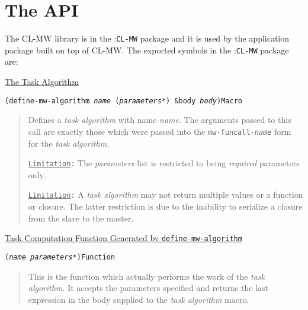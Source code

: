 \documentclass[titlepage,12pt]{book}
\newcommand{\xsmall}{\latexhtml{\small}{}}
\newcommand{\xnormalsize}{\latexhtml{\normalsize}{}}
\newcommand{\clmw}{\xsmall\textsc{CL-MW}\xnormalsize\xspace}
\newcommand{\package}[1]{\mbox{:\uppercase{\xsmall\texttt{#1}\xnormalsize}} package\xspace}
\newcommand{\mwpackage}{\package{CL-MW}}
\newcommand{\ta}{\textit{task algorithm}\xspace}
\newcommand{\macro}[1]{\mbox{\texttt{#1}}\xspace}
\newcommand{\genmacroname}[1]{\mbox{\texttt{#1\textit{name}}}\xspace}
\newcommand{\Limitation}{\texttt{\underline{Limitation}:}\xspace}
\newcommand{\apiheader}[1]{\begin{center}\underline{#1}\end{center}}
\newcommand{\apifunc}[2]{\noindent\xsmall\texttt{(#1)}\hspace*{\fill}\xnormalsize\texttt{#2}}
\newenvironment{apientry}[2]
	{\apifunc{#1}{#2}\begin{quotation}}
	{\end{quotation}}
\begin{document}
\section{The API}

The \clmw library is in the \mwpackage and it is used by the application
package built on top of \clmw. The exported symbols in the \mwpackage are:

\apiheader{The Task Algorithm}

\begin{apientry}
{define-mw-algorithm \emph{name} (\emph{parameters*}) \&body \emph{body}}
{Macro}
Defines a \ta with name \emph{name}. The arguments passed to this
call are exactly those which were passed into the \genmacroname{mw-funcall-}
form for the \ta.

\Limitation The \emph{parameters} list is restricted to being \emph{required}
parameters only. 

\Limitation A \ta may not return multiple values or a
function or closure. The latter restriction is due to the inability
to serialize a closure from the slave to the master.
\end{apientry}

\apiheader{Task Computation Function Generated by \macro{define-mw-algorithm}}
\begin{apientry}
{\textit{name} \textit{parameters*}}
{Function}
This is the function which actually performs the work of the \ta. It
accepts the parameters specified and returns the last expression in
the body supplied to the \ta macro.
\end{apientry}
\end{document}
